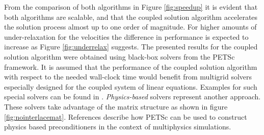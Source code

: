 From the comparison of both algorithms in Figure \ref{fig:speedup} it is evident that both algorithms are scalable, and that the coupled solution algorithm accelerates the solution process almost up to one order of magnitude. For higher amounts of under-relaxation for the velocities the difference in performance is expected to increase as Figure \ref{fig:underrelax} suggests. The presented results for the coupled solution algorithm were obtained using black-box solvers from the PETSc framework. It is assumed that the performance of the coupled solution algorithm with respect to the needed wall-clock time would benefit from multigrid solvers especially designed for the coupled system of linear equations. Examples for such special solvers can be found in \cite{darwish09,klaij13,mangani14}. \emph{Physics-based} solvers represent another approach. These solvers take advantage of the matrix structure as shown in figure \ref{fig:nointerlacemat}. References \cite{brown12,mcinnes14} describe how PETSc can be used to construct physics based preconditioners in the context of multiphysics simulations.


